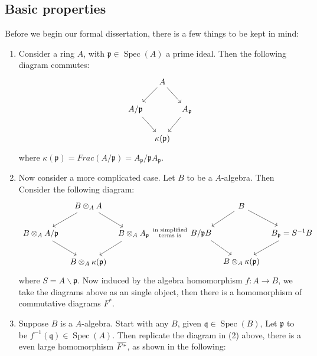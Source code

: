\documentclass[12pt]{article}
\theoremstyle{definition}
\theoremstyle{plain}
\DeclareMathOperator{\Spec}{Spec}
\newcommand{\overbar}[1]{\mkern 1.5mu\overline{\mkern-1.5mu#1\mkern-1.5mu}\mkern 1.5mu}
\renewcommand{\bar}{\overbar}
\begin{document}
 \subsection{Basic properties}
 Before we begin our formal dissertation, there is a few things to be kept in mind:
 \begin{enumerate}
   \item Consider a ring $A$, with $\mathfrak{p}\in \Spec(A)$ a prime ideal. Then the following diagram commutes:
   \begin{equation}
     \begin{tikzcd}[column sep=tiny]
       &A\ar{rd}\ar{ld}\\
       A/\mathfrak{p}\ar{rd} & &A_\mathfrak{p}\ar{ld}\\
       & \kappa(\mathfrak{p})
     \end{tikzcd}
   \end{equation}
   where $\kappa(\mathfrak{p})=Frac(A/\mathfrak{p})=A_\mathfrak{p}/\mathfrak{p}A_\mathfrak{p}$.
   \item Now consider a more complicated case. Let $B$ to be a $A$-algebra. Then Consider the following diagram:
   \begin{equation}
     \begin{tikzcd}[column sep=tiny]
        &B\otimes_A A\ar{rd}\ar{ld}\\
       B\otimes_AA/\mathfrak{p}\ar{rd} & &B\otimes_AA_\mathfrak{p}\ar{ld}\\
       & B\otimes_A\kappa(\mathfrak{p})
     \end{tikzcd}
   \substack{\text{in simplified}\\ \text{terms is}}
     \begin{tikzcd}[column sep=tiny]
       &B\ar{rd}\ar{ld}\\
       B/\mathfrak{p}B\ar{rd} & &B_\mathfrak{p}=S^{-1}B\ar{ld}\\
       & B\otimes_A\kappa(\mathfrak{p})
     \end{tikzcd}
   \end{equation}
   where $S=A\backslash \mathfrak{p}$. Now induced by the algebra homomorphism $f: A\to B$, we take the diagrams above as an single object, then there is a homomorphism of commutative diagrams $F^*$.
   \item Suppose $B$ is a $A$-algebra. Start with any $B$, given $\mathfrak{q}\in \Spec(B)$, Let $\mathfrak{p}$ to be $f^{-1}(\mathfrak{q})\in \Spec(A)$. Then replicate the diagram in (2) above, there is a even large homomorphism $\bar{F^*}$, as shown in the following:

\end{enumerate}
\end{document}

